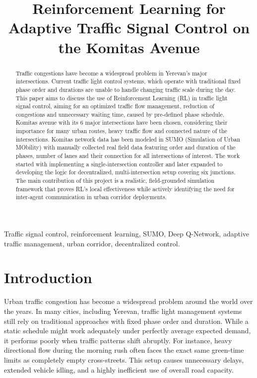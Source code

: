 \documentclass[conference]{IEEEtran}
\begin{document}
\title{Reinforcement Learning for Adaptive Traffic Signal Control on the Komitas Avenue}

\author{
}
\maketitle

\begin{abstract}
Traffic congestions have become a widespread problem in Yerevan's major intersections. Current traffic light control systems, which operate with traditional fixed phase order and durations are unable to handle changing traffic scale during the day. This paper aims to discuss the use of Reinforcement Learning (RL) in traffic light signal control, aiming for an optimized traffic flow management, reduction of congestions and unnecessary waiting time, caused by pre-defined phase schedule. Komitas avenue with its 6 major intersections have been chosen, considering their importance for many urban routes, heavy traffic flow and connected nature of the intersections. Komitas network data has been modeled in SUMO (Simulation of Urban MObility) with manually collected real field data featuring order and duration of the phases, number of lanes and their connection for all intersections of interest. The work started with implementing a single-intersection controller and later expanded to developing the logic for decentralized, multi-intersection setup covering six junctions. The main contribution of this project is a realistic, field-grounded simulation framework that proves RL’s local effectiveness while actively identifying the need for inter-agent communication in urban corridor deployments.
\end{abstract}

\begin{IEEEkeywords}
Traffic signal control, reinforcement learning, SUMO, Deep Q-Network, adaptive traffic management, urban corridor, decentralized control.
\end{IEEEkeywords}

\section{Introduction}

Urban traffic congestion has become a widespread problem around the world over the years. In many cities, including Yerevan, traffic light management systems still rely on traditional approaches with fixed phase order and duration. While a static schedule might work adequately under perfectly average expected demand, it performs poorly when traffic patterns shift abruptly. For instance, heavy directional flow during the morning rush often faces the exact same green-time limits as completely empty cross-streets. This setup causes unnecessary delays, extended vehicle idling, and a highly inefficient use of overall road capacity.
\end{document}
